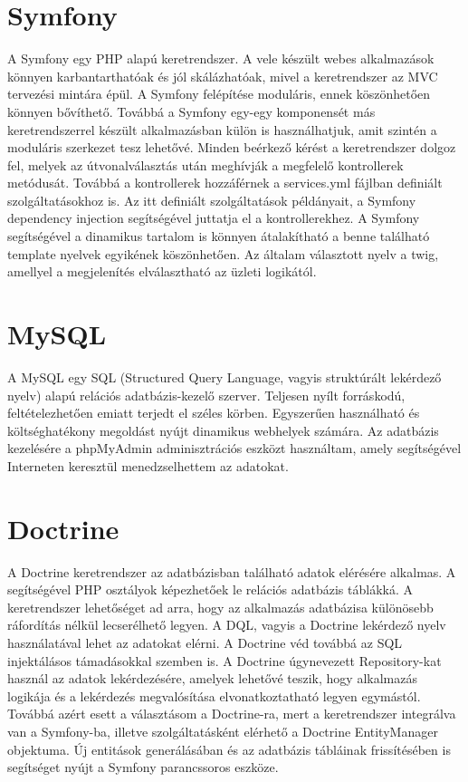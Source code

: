 \section*{Symfony}
A Symfony egy PHP alapú keretrendszer.
A vele készült webes alkalmazások könnyen karbantarthatóak és jól skálázhatóak, mivel a keretrendszer az MVC tervezési mintára épül.
A Symfony felépítése moduláris, ennek köszönhetően könnyen bővíthető.
Továbbá a Symfony egy-egy komponensét más keretrendszerrel készült alkalmazásban külön is használhatjuk, amit szintén a moduláris szerkezet tesz lehetővé.
Minden beérkező kérést a keretrendszer dolgoz fel, melyek az útvonalválasztás után meghívják a megfelelő kontrollerek metódusát.
Továbbá a kontrollerek hozzáférnek a services.yml fájlban definiált szolgáltatásokhoz is.
Az itt definiált szolgáltatások példányait, a Symfony dependency injection segítségével juttatja el a kontrollerekhez.
A Symfony segítségével a dinamikus tartalom is könnyen átalakítható a benne található template nyelvek egyikének köszönhetően.
Az általam választott nyelv a twig, amellyel a megjelenítés elválasztható az üzleti logikától. 

\section*{MySQL}
A MySQL\cite{mysql} egy SQL (Structured Query Language, vagyis struktúrált lekérdező nyelv) alapú relációs adatbázis-kezelő szerver.
Teljesen nyílt forráskodú, feltételezhetően emiatt terjedt el széles körben.
Egyszerűen használható és költséghatékony megoldást nyújt dinamikus webhelyek számára.
Az adatbázis kezelésére a phpMyAdmin adminisztrációs eszközt használtam, amely segítségével Interneten keresztül menedzselhettem az adatokat.

\section*{Doctrine}
A Doctrine keretrendszer az adatbázisban található adatok elérésére alkalmas.
A segítségével PHP osztályok képezhetőek le relációs adatbázis táblákká.
A keretrendszer lehetőséget ad arra, hogy az alkalmazás adatbázisa különösebb ráfordítás nélkül lecserélhető legyen.
A DQL, vagyis a Doctrine lekérdező nyelv használatával lehet az adatokat elérni.
A Doctrine véd továbbá az SQL injektálásos támadásokkal szemben is.
A Doctrine úgynevezett Repository-kat használ az adatok lekérdezésére, amelyek lehetővé teszik, hogy alkalmazás logikája és a lekérdezés megvalósítása elvonatkoztatható legyen egymástól.
Továbbá azért esett a választásom a Doctrine-ra, mert a keretrendszer integrálva van a Symfony-ba, illetve szolgáltatásként elérhető a Doctrine EntityManager objektuma.
Új entitások generálásában és az adatbázis tábláinak frissítésében is segítséget nyújt a Symfony parancssoros eszköze.













